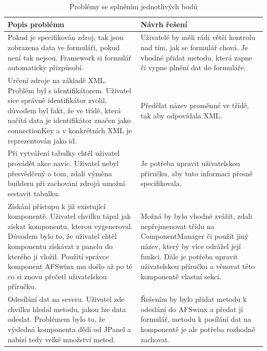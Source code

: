 \begin{table}[width=\linewidth]
\begin{center}
\caption{Problémy se splněním jednotlivých bodů}
\label{table:userTestResult}
\begin{tabular}{|p{7cm}|p{7cm}|}
\hline
\textbf{Popis problému} & \textbf{Návrh řešení} \\
\hline
Pokud je specifikován zdroj, tak jsou zobrazena data ve formuláři, pokud není tak nejsou. Framework si formulář automaticky přizpůsobí. & 
Uživatelé by měli rádi větší kontrolu nad tím, jak se formulář chová. Je vhodné přidat metodu, která zapne či vypne plnění dat do formuláře. \\
\hline
Určení zdroje na základě XML. Problém byl s identifikátorem. Uživatel sice správně identifikátor zvolil, důvodem byl fakt, že ve třídě, která načítá data je identifikátor značen jako connectionKey a v konkrétních XML je reprezentován jako id. & 
Předělat název proměnné ve třídě, tak aby odpovídala XML. \\
\hline
Při vytváření tabulky chtěl uživatel provádět akce navíc. Uživatel nebyl přesvědčený o tom, zdali výměna builderu při zachování zdrojů umožní sestavit tabulku. & Je potřeba upravit uživatelskou příručku, aby tuto informaci přesně specifikovala. \\
\hline
Získání přístupu k již existující komponentě. Uživatel chvilku tápal jak získat komponentu, kterou vygeneroval. Důvodem bylo to, že uživatel chtěl komponentu získávat z panelu do kterého ji vložil. Použití správce komponent AFSwinx mu došlo až po té co si znovu přečetl uživatelskou příručku. & Možná by bylo vhodné zvážit, zdali nepřejmenovat třídu na ComponentManager či použít jiný název, který by více odrážel její funkci. Dále je potřeba upravit uživatelskou příručku a věnovat této komponentě vlastní sekci. \\
\hline
Odesílání dat na severu. Uživatel zde chvilku hledal metodu, jakou lze data odeslat. Problémem bylo to, že výsledná komponenta dědí od JPanel a nabízí tedy velké množství metod. & Řešením by bylo přidat metodu k odeslání do AFSwinx a předat jí formulář, metodu k posílání dat na komponentě je ale potřeba rozhodně zachovat. \\
\hline
\end{tabular}
\end{center}
\end{table}
